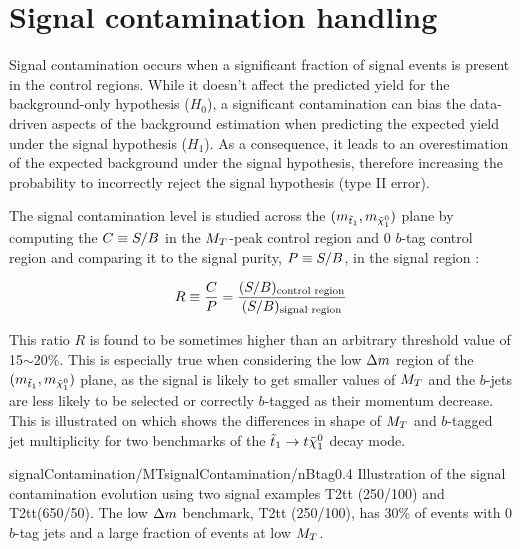     \section{Signal contamination handling \label{sec:signalContamination}}

        Signal contamination occurs when a significant fraction of signal events is present in
        the control regions. While it doesn't affect the predicted yield for the background-only hypothesis
        ($H_0$), a significant contamination can bias the data-driven aspects of the background
        estimation when predicting the expected yield under the signal hypothesis ($H_1$). As a
        consequence, it leads to an overestimation of the expected background under the signal hypothesis,
        therefore increasing the probability to incorrectly reject the signal hypothesis (type II error).

        The signal contamination level is studied across the $(m_{\tilde{t}_1},m_{\tilde{\chi}_1^0})$
        plane by computing the $C \equiv S/B$ in the $M_T$-peak control region and 0 $b$-tag
        control region and comparing it to the signal purity, $P \equiv S/B$, in the signal region :

        \begin{equation}
            R \equiv \frac{C}{P} = \frac{(S/B)_\text{control region}}{(S/B)_\text{signal region}}
            \label{eq:contaminationRatio}
        \end{equation}

        This ratio $R$ is found to be sometimes higher than an arbitrary threshold value of 15$\sim$20\%.
        This is especially true when considering the low $\Delta m$ region of the $(m_{\tilde{t}_1},
        m_{\tilde{\chi}_1^0})$ plane, as the signal is likely to get smaller values of $M_T$ and the $b$-jets
        are less likely to be selected or correctly $b$-tagged as their momentum decrease. This is illustrated
        on  which shows the differences in shape of $M_T$ and
        $b$-tagged jet multiplicity for two benchmarks of the $\tilde{t}_1 \rightarrow t \tilde{\chi}_1^0$ decay mode.

                         {signalContamination/MT}{signalContamination/nBtag}{0.4}
                         {Illustration of the signal contamination evolution using two signal examples
                         T2tt (250/100) and T2tt(650/50). The low $\Delta m$ benchmark, T2tt (250/100),
                         has 30\% of events with 0$b$-tag jets and a large fraction of events at low $M_T$.}

